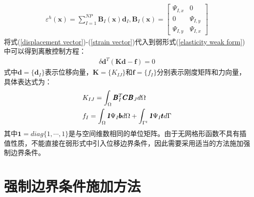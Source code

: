 \begin{equation}\label{strain vector}
\begin{split}
    \varepsilon^h(\pmb{x})=\sum_{I=1}^{N\!P}\pmb{B}_I(\pmb{x})\pmb{d}_I,\pmb{B}_I(\pmb{x})= \left[\begin{matrix}\Psi_{I,x}&0\\0&\Psi_{I,y}\\\Psi_{I,y}&\Psi_{I,x} \end{matrix}\right] 
\end{split}
\end{equation}
将式(\ref{displacement vector})-(\ref{strain vector})代入到弱形式(\ref{elasticity weak form})中可以得到离散控制方程：
\begin{equation}
\begin{split}
    \delta\pmb{d}^T(\pmb{K}\pmb{d}-\pmb{f})=0
\end{split}
\end{equation}
式中$\pmb{d}=\{\pmb d_I\}$表示位移向量，$\pmb{K}=\{K_{IJ}\}$和$\pmb{f}=\{f_I\}$分别表示刚度矩阵和力向量，具体表达式为：
\begin{equation}
\begin{split}\label{KIJ}
        &K_{IJ}=\int_{\Omega}\pmb{B}_I^T\pmb{C}\pmb{B}_Jd\Omega\\
        &f_I=\int_{\Omega}\pmb{\textsl{1}}\Psi_I\pmb{b}d\Omega+\int_{\Gamma^t}\pmb{\textsl{1}}\Psi_I\pmb{t}d\Gamma
\end{split}
\end{equation}
其中$\pmb{1}=diag\{1,\dotsb,1\}$是与空间维数相同的单位矩阵。由于无网格形函数不具有插值性质，不能直接在弱形式中引入位移边界条件，因此需要采用适当的方法施加强制边界条件。
\section{强制边界条件施加方法}
